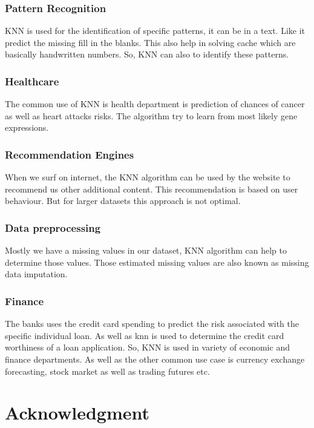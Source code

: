 \documentclass[conference]{IEEEtran}
\begin{document}
\subsubsection{Pattern Recognition}
KNN is used for the identification of specific patterns, it can be in a text. Like it predict the missing fill in the blanks. This also help in solving cache which are basically handwritten numbers. So, KNN can also
to identify these patterns.


\subsubsection{Healthcare}
The common use of KNN is health department is prediction of chances of cancer as well as heart attacks risks. The algorithm try to learn from most likely gene expressions. 

\subsubsection{Recommendation Engines}
When we surf on internet, the KNN algorithm can be used by the website to recommend us other additional content. This recommendation is based on user behaviour. But for larger datasets this approach is not optimal. 

\subsubsection{Data preprocessing}
Mostly we have a missing values in our dataset, KNN algorithm can help to determine those values. Those estimated missing values are also known as missing data imputation. 

\subsubsection{Finance}
The banks uses the credit card spending to predict the risk associated with the specific individual loan. As well as knn is used to determine the credit card worthiness of a loan application. So, KNN is used in variety of economic and finance departments. As well as the other common use case is currency exchange forecasting, stock market as well as trading futures etc.  







\section*{Acknowledgment}
\end{document}
